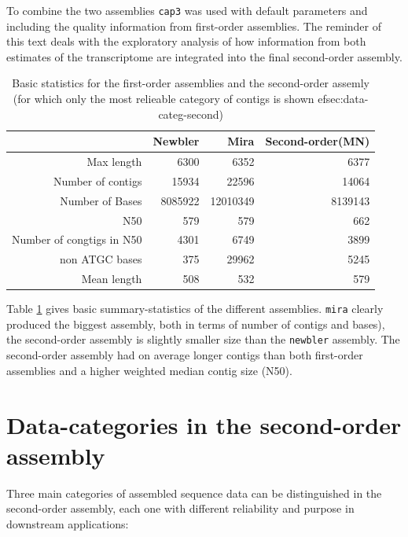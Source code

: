 \documentclass[12pt,a4paper]{article}
\begin{document}
To combine the two assemblies \texttt{cap3} was used with default
parameters and including the quality information from first-order
assemblies. The reminder of this text deals with the exploratory
analysis of how information from both estimates of the transcriptome
are integrated into the final second-order assembly. 

\begin{table}[ht]
\begin{center}
\begin{tabular}{rrrr}
  \hline
 & Newbler & Mira & Second-order(MN) \\ 
  \hline
Max length & 6300 & 6352 & 6377 \\ 
  Number of contigs & 15934 & 22596 & 14064 \\ 
  Number of Bases & 8085922 & 12010349 & 8139143 \\ 
  N50 & 579 & 579 & 662 \\ 
  Number of congtigs in N50 & 4301 & 6749 & 3899 \\ 
  non ATGC bases & 375 & 29962 & 5245 \\ 
  Mean length & 508 & 532 & 579 \\ 
   \hline
\end{tabular}
\caption{Basic statistics for the first-order assemblies and the second-order assemly (for which only the most relieable category of contigs is shown 
ef{sec:data-categ-second})}
\label{tab:pc}
\end{center}
\end{table}
Table \ref{tab:pc} gives basic summary-statistics of the different
assemblies. \texttt{mira} clearly produced the biggest assembly, both
in terms of number of contigs and bases), the second-order assembly is
slightly smaller size than the \texttt{newbler} assembly.  The
second-order assembly had on average longer contigs than both
first-order assemblies and a higher weighted median contig size (N50).



\newpage
\section{Data-categories in the second-order assembly}
\label{sec:data-categ-second}

Three main categories of assembled sequence data can be distinguished
in the second-order assembly, each one with different reliability and
purpose in downstream applications:
\end{document}
